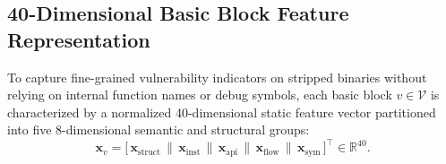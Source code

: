 \documentclass[10pt,conference]{IEEEtran}
\begin{document}
\subsection{40-Dimensional Basic Block Feature Representation}
To capture fine-grained vulnerability indicators on stripped binaries without relying on internal function names or debug symbols,
each basic block $v \in \mathcal{V}$ is characterized by a normalized 40-dimensional static feature vector partitioned into five
8-dimensional semantic and structural groups:
\begin{equation}
  \mathbf{x}_v = \big[\, \mathbf{x}_{\text{struct}} \,\|\, \mathbf{x}_{\text{inst}} \,\|\, \mathbf{x}_{\text{api}} \,\|\,
  \mathbf{x}_{\text{flow}} \,\|\, \mathbf{x}_{\text{sym}} \,\big]^\top \in \mathbb{R}^{40}.
  \label{eq:features}
\end{equation}
\end{document}
